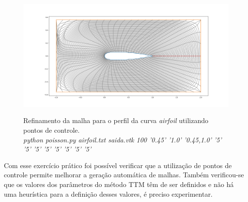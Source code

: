 \documentclass[a4paper]{article}
\begin{document}
\begin{figure}[ht]
	\centering
	\includegraphics[width=1.0\textwidth]{airfoil_border_refinement6.png}
	\label{fig:airfoil_refinement} 
	\caption[caption]{Refinamento da malha para o perfil da curva \textit{airfoil} utilizando pontos de controle. \\\hspace{\textwidth} \textit{python poisson.py airfoil.txt saida.vtk 100 '0.45' '1.0' '0.45,1.0' '5' '5' '5' '5' '5' '5' '5' '5'}}
\end{figure}


Com esse exercício prático foi possível verificar que a utilização de pontos de controle permite melhorar a geração automática de malhas. Também verificou-se que os valores dos parâmetros do método TTM têm de ser definidos e não há uma heurística para a definição desses valores, é preciso experimentar.
\end{document}

